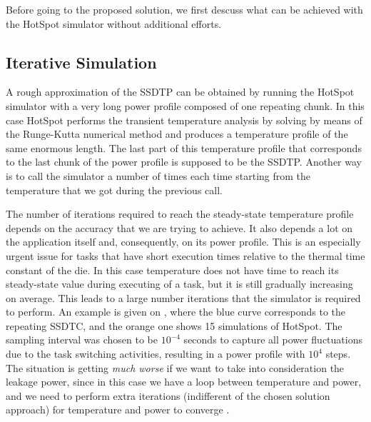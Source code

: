 Before going to the proposed solution, we first descuss what can be achieved with the HotSpot simulator without additional efforts.

\subsection{Iterative Simulation}
A rough approximation of the SSDTP can be obtained by running the HotSpot simulator with a very long power profile composed of one repeating chunk. In this case HotSpot performs the transient temperature analysis by solving  by means of the Runge-Kutta numerical method and produces a temperature profile of the same enormous length. The last part of this temperature profile that corresponds to the last chunk of the power profile is supposed to be the SSDTP. Another way is to call the simulator a number of times each time starting from the temperature that we got during the previous call.

The number of iterations required to reach the steady-state temperature profile depends on the accuracy that we are trying to achieve. It also depends a lot on the application itself and, consequently, on its power profile. This is an especially urgent issue for tasks that have short execution times relative to the thermal time constant of the die. In this case temperature does not have time to reach its steady-state value during executing of a task, but it is still gradually increasing on average. This leads to a large number iterations that the simulator is required to perform. An example is given on , where the blue curve corresponds to the repeating SSDTC, and the orange one shows 15 simulations of HotSpot. The sampling interval was chosen to be $10^{-4}$ seconds to capture all power fluctuations due to the task switching activities, resulting in a power profile with $10^4$ steps. The situation is getting \emph{much worse} if we want to take into consideration the leakage power, since in this case we have a loop between temperature and power, and we need to perform extra iterations (indifferent of the chosen solution approach) for temperature and power to converge \cite{liu2007}.

